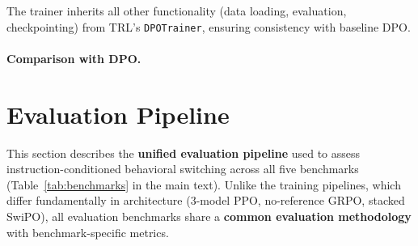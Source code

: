 The trainer inherits all other functionality (data loading, evaluation, checkpointing) from TRL's \texttt{DPOTrainer}, ensuring consistency with baseline DPO.

\paragraph{Comparison with DPO.}
\begin{table}[ht!]
\centering
{}
\caption{Key differences between the DPO and SwiPO training pipelines.}
\label{tab:dpo_vs_cita_comparison}
\end{table}

\section{Evaluation Pipeline}
\label{sec:appendix_evaluation_pipeline}

This section describes the \textbf{unified evaluation pipeline} used to assess instruction-conditioned behavioral switching across all five benchmarks (Table~\ref{tab:benchmarks} in the main text). Unlike the training pipelines, which differ fundamentally in architecture (3-model PPO, no-reference GRPO, stacked SwiPO), all evaluation benchmarks share a \textbf{common evaluation methodology} with benchmark-specific metrics.

